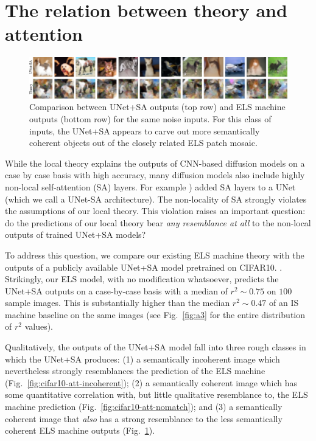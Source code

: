 \documentclass{article}
\theoremstyle{plain}
\theoremstyle{definition}
\theoremstyle{remark}
\begin{document}
\section{The relation between theory and attention}\label{sec:attention}
\begin{figure}[b]
    \centering
    \includegraphics[width=0.97\linewidth]{sa_fig_line3.png} \vspace{-1em}
    \caption{Comparison between UNet+SA outputs (top row) and ELS machine outputs (bottom row) for the same noise inputs. For this class of inputs, the UNet+SA appears to carve out more semantically coherent objects out of the closely related ELS patch mosaic.}
    \label{fig:sa_fig}
\end{figure}

While the local theory explains the outputs of CNN-based diffusion models on a case by case basis with high accuracy, many diffusion models also include highly non-local self-attention (SA) layers. For example \cite{ho2020denoising}) added SA layers to a UNet (which we call a UNet-SA architecture). The non-locality of SA strongly violates the assumptions of our local theory.  This violation raises an important question: do the predictions of our local theory bear {\it any resemblance at all} to the non-local outputs of trained UNet+SA models?  

To address this question, we compare our existing ELS machine theory with the outputs of a publicly available UNet+SA model pretrained on CIFAR10.  \cite{VSehwag_minimal_diffusion}. Strikingly, our ELS model, with no modification whatsoever, predicts the UNet+SA outputs on a case-by-case basis with a median of $r^2 \sim 0.75$ on $100$ sample images. This is substantially higher than the median $r^2 \sim 0.47$ of an IS machine baseline on the same images (see Fig.~\ref{fig:a3} for the entire distribution of $r^2$ values).


Qualitatively, the outputs of the UNet+SA model fall into three rough classes in which the UNet+SA produces: (1) a semantically incoherent image which nevertheless strongly resemblances the prediction of the ELS machine (Fig.~\ref{fig:cifar10-att-incoherent}); (2) a semantically coherent image which has some quantitative correlation with, but little qualitative resemblance to, the ELS machine prediction (Fig.~\ref{fig:cifar10-att-nomatch}); and (3) a semantically coherent image that \textit{also} has a strong resemblance to the less semantically coherent ELS machine outputs (Fig.~\ref{fig:sa_fig}). 
\end{document}
